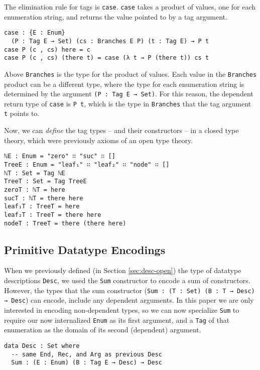 \documentclass[runningheads,a4paper]{llncs}
\newcommand{\refsec}[1]{Section \ref{sec:#1}}
\begin{document}
The elimination rule for tags is {\tt case}. {\tt case} takes a product of
values, one for each enumeration string, and returns the value pointed
to by a tag argument.

\begin{verbatim}
case : {E : Enum}
  (P : Tag E → Set) (cs : Branches E P) (t : Tag E) → P t
case P (c , cs) here = c
case P (c , cs) (there t) = case (λ t → P (there t)) cs t
\end{verbatim}

Above {\tt Branches} is the type for the product of values.
Each value in the {\tt Branches} product can be a different type, where
the type for each enumeration string is determined by the argument
{\tt (P : Tag E → Set)}. For this reason, the dependent return type of
{\tt case} is {\tt P t}, which is the type in {\tt Branches} that the
tag argument {\tt t} points to.

Now, we can {\it define} the tag types -- and their constructors -- in
a closed type theory, which were previously axioms of an open type theory.

\begin{verbatim}
ℕE : Enum = "zero" ∷ "suc" ∷ []
TreeE : Enum = "leaf₁" ∷ "leaf₂" ∷ "node" ∷ []
ℕT : Set = Tag ℕE
TreeT : Set = Tag TreeE
zeroT : ℕT = here
sucT : ℕT = there here
leaf₁T : TreeT = here
leaf₂T : TreeT = there here
nodeT : TreeT = there (there here)
\end{verbatim}

\subsection{Primitive Datatype Encodings}

When we previously defined (in \refsec{desc-open}) the type of datatype descriptions
{\tt Desc}, we used the {\tt Sum} constructor to encode a sum of
constructors. However, the types that the sum constructor
({\tt Sum : (T : Set) (B : T → Desc) → Desc}) can encode, include any dependent
arguments. In this paper we are only interested in encoding
non-dependent types, so we can now specialize {\tt Sum} to require our
now internalized {\tt Enum} as its first argument, and a {\tt Tag} of
that enumeration as the domain of its second (dependent) argument.

\begin{verbatim}
data Desc : Set where
  -- same End, Rec, and Arg as previous Desc
  Sum : (E : Enum) (B : Tag E → Desc) → Desc
\end{verbatim}
\end{document}
